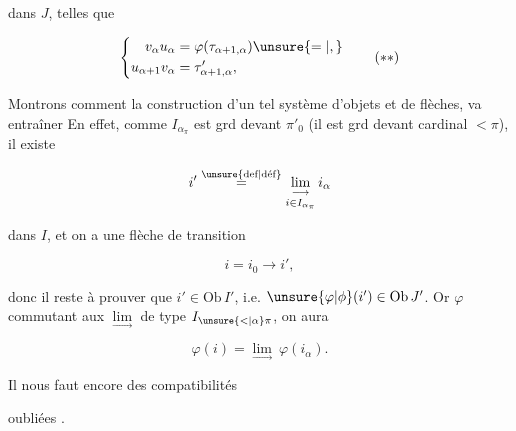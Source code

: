 dans $J$, telles que

\[
\left\{\begin{aligned}
v_\alpha u_\alpha&=\varphi(\tau_{\alpha+1,\alpha})\unsure{=|,}\\
u_{\alpha+1}v_\alpha&=\tau'_{\alpha+1,\alpha},
\end{aligned}\right.\tag*{$(**)$}
\]



Montrons comment la construction d'un tel système d'objets et de flèches,  va entraîner    En effet, comme $I_{\alpha_\pi}$ est grd devant $\pi'_0$ (il est grd devant  cardinal $<\pi$),  il existe

\[
i'\overset{\text{\unsure{def|déf}}}{=}\underset{i\in I_{\alpha_\pi}}{\underset{\longrightarrow}{\lim}}\,i_\alpha
\]

dans $I$, et on a une flèche de transition

\[
i=i_0\longrightarrow i',
\]

donc il reste à prouver que $i'\in\mathrm{Ob}\,I'$, i.e. $\unsure{\varphi|\phi}(i')\in\mathrm{Ob}\,J'$. Or $\varphi$ commutant aux $\underset{\longrightarrow}{\lim}$ de type $I_{\unsure{<|\alpha}\pi}$, on aura

\[
\varphi(i)=\underset{\longrightarrow}{\lim}\ \varphi(i_\alpha).
\]

Il nous faut encore des compatibilités


oubliées .


